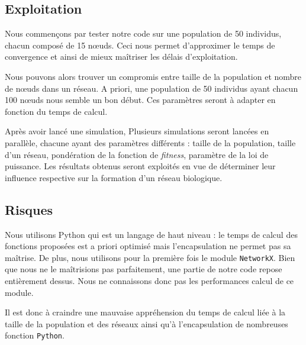 \subsection{Exploitation}

Nous commençons par tester notre code sur une population de 50 individus, chacun composé de 15 nœuds. Ceci nous permet d'approximer le temps de convergence et ainsi de mieux ma\^itriser les délais d'exploitation.

Nous pouvons alors trouver un compromis entre taille de la population et nombre de nœuds dans un réseau. A priori, une population de 50 individus ayant chacun 100 nœuds nous semble un bon début. Ces paramètres seront à adapter en fonction du temps de calcul.

Après avoir lancé une simulation, Plusieurs simulations seront lancées en parallèle, chacune ayant des paramètres différents : taille de la population, taille d'un réseau, pondération de la fonction de \textit{fitness}, paramètre de la loi de puissance. Les résultats obtenus seront exploités en vue de déterminer leur influence respective sur la formation d'un réseau biologique.

\subsection{Risques}
Nous utilisons Python qui est un langage de haut niveau : le temps de calcul des fonctions proposées est a priori optimisé mais l'encapsulation ne permet pas sa maîtrise. De plus, nous utilisons pour la première fois le module \verb?NetworkX?. Bien que nous ne le ma\^itrisions pas parfaitement, une partie de notre code repose entièrement dessus. Nous ne connaissons donc pas les performances calcul de ce module.

Il est donc à craindre une mauvaise appréhension du temps de calcul liée à la taille de la population et des réseaux ainsi qu'à l'encapsulation de nombreuses fonction \verb?Python?.



